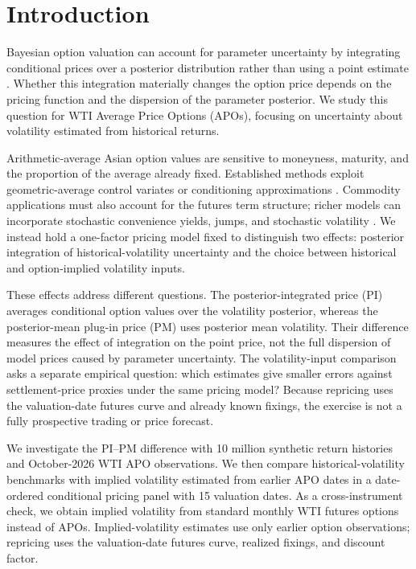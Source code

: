 \section{Introduction}\label{sec:short_intro}

Bayesian option valuation can account for parameter uncertainty by integrating conditional prices over a posterior distribution rather than using a point estimate \citep{guidolin2003,romboutsstentoft2014,guptareisinger2014}. Whether this integration materially changes the option price depends on the pricing function and the dispersion of the parameter posterior. We study this question for WTI Average Price Options (APOs), focusing on uncertainty about volatility estimated from historical returns.

Arithmetic-average Asian option values are sensitive to moneyness, maturity, and the proportion of the average already fixed. Established methods exploit geometric-average control variates or conditioning approximations \citep{kemnavorst1990,curran1994}. Commodity applications must also account for the futures term structure; richer models can incorporate stochastic convenience yields, jumps, and stochastic volatility \citep{schwartz1997,shirayatakahashi2011,ewaldwu2023}. We instead hold a one-factor pricing model fixed to distinguish two effects: posterior integration of historical-volatility uncertainty and the choice between historical and option-implied volatility inputs.

These effects address different questions. The posterior-integrated price (PI) averages conditional option values over the volatility posterior, whereas the posterior-mean plug-in price (PM) uses posterior mean volatility. Their difference measures the effect of integration on the point price, not the full dispersion of model prices caused by parameter uncertainty. The volatility-input comparison asks a separate empirical question: which estimates give smaller errors against settlement-price proxies under the same pricing model? Because repricing uses the valuation-date futures curve and already known fixings, the exercise is not a fully prospective trading or price forecast.

We investigate the PI--PM difference with 10 million synthetic return histories and October-2026 WTI APO observations. We then compare historical-volatility benchmarks with implied volatility estimated from earlier APO dates in a date-ordered conditional pricing panel with 15 valuation dates. As a cross-instrument check, we obtain implied volatility from standard monthly WTI futures options instead of APOs. Implied-volatility estimates use only earlier option observations; repricing uses the valuation-date futures curve, realized fixings, and discount factor.

